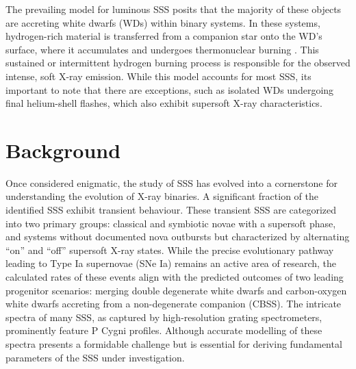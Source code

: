         	The prevailing model for luminous SSS posits that the majority of these objects are accreting white dwarfs (WDs) within binary systems. In these systems, hydrogen-rich material is transferred from a companion star onto the WD's surface, where it accumulates and undergoes thermonuclear burning \cite{vandenHeuvel92}. This sustained or intermittent hydrogen burning process is responsible for the observed intense, soft X-ray emission. While this model accounts for most SSS, its important to note that there are exceptions, such as isolated WDs undergoing final helium-shell flashes, which also exhibit supersoft X-ray characteristics.
    
    \section{Background} \label{introduction:background}
    	Once considered enigmatic, the study of SSS has evolved into a cornerstone for understanding the evolution of X-ray binaries. A significant fraction of the identified SSS exhibit transient behaviour. These transient SSS are categorized into two primary groups: classical and symbiotic novae with a supersoft phase, and systems without documented nova outbursts but characterized by alternating ``on'' and ``off'' supersoft X-ray states. While the precise evolutionary pathway leading to Type Ia supernovae (SNe Ia) remains an active area of research, the calculated rates of these events align with the predicted outcomes of two leading progenitor scenarios: merging double degenerate white dwarfs and carbon-oxygen white dwarfs accreting from a non-degenerate companion (CBSS). The intricate spectra of many SSS, as captured by high-resolution grating spectrometers, prominently feature P Cygni profiles. Although accurate modelling of these spectra presents a formidable challenge but is essential for deriving fundamental parameters of the SSS under investigation.
    
